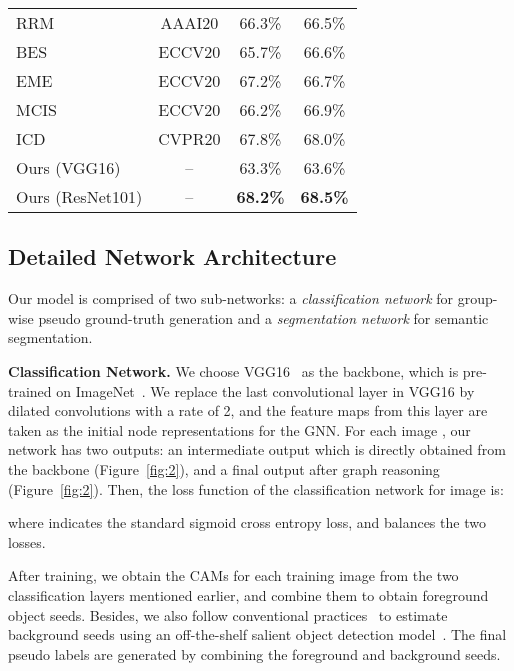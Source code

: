 \documentclass[letterpaper]{article} \usepackage{aaai21}  \usepackage{times}  \usepackage{helvet} \usepackage{courier}  \usepackage[hyphens]{url}  \usepackage{graphicx} \urlstyle{rm} \def\UrlFont{\rm}  \usepackage{graphicx}  \usepackage{natbib}  \usepackage{caption} \frenchspacing  \setlength{\pdfpagewidth}{8.5in}  \setlength{\pdfpageheight}{11in}
\newcommand{\figref}[1]{Figure~\ref{#1}}
\begin{document}
\begin{table}[t]
\begin{tabular}{l|c|cc}
		RRM{\!~\tiny~\cite{zhang2020reliability}}  & AAAI20  & 66.3\% & 66.5\% \\
		BES{\!~\tiny~\cite{chenweakly}}  & ECCV20  & 65.7\% & 66.6\% \\
		EME{\!~\tiny~\cite{fanemploying}}  & ECCV20  & 67.2\% & 66.7\% \\
		MCIS{\!~\tiny~\cite{sun2020mining}}  & ECCV20  & 66.2\% & 66.9\% \\
		ICD{\!~\tiny~\cite{fan2020learning}} & CVPR20  & 67.8\% & 68.0\% \\ \hline
		Ours (VGG16)  & -- & 63.3\% & 63.6\% \\
		Ours (ResNet101) & -- & \textbf{68.2\%} & \textbf{68.5\%} \\ 
		\hline
	\end{tabular}
	
	\label{table:1}
\end{table}



\subsection{Detailed Network Architecture}

Our model is comprised of two sub-networks: a \textit{classification network} for group-wise pseudo ground-truth generation and a \textit{segmentation network} for semantic segmentation. 

\noindent\textbf{Classification Network.}
We choose VGG16~\cite{simonyan2014very} as the backbone, which is pre-trained on ImageNet~\cite{deng2009imagenet}. We replace the last convolutional layer in VGG16 by dilated convolutions with a rate of 2, and the feature maps from this layer are taken as the initial node representations for the GNN. For each image , our network has two outputs: an intermediate output  which is directly obtained from the backbone (\figref{fig:2}), and a final output  after graph reasoning (\figref{fig:2}). Then, the loss function of the classification network for image  is:
  
where  indicates the standard sigmoid cross entropy loss, and  balances the two losses.

After training, we obtain the CAMs for each training image from the two classification layers mentioned earlier, and combine them to obtain foreground object seeds. Besides, we also follow conventional practices~\cite{jiang2019integral,fan2020learning} to estimate background seeds using an off-the-shelf salient object detection model~\cite{hou2017deeply}. The final pseudo labels are generated by combining the foreground and background seeds.
\end{document}
